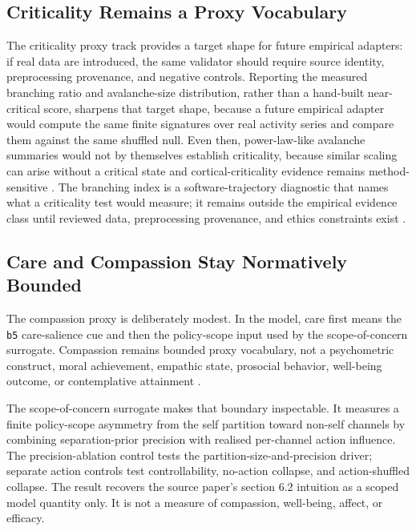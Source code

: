 \documentclass[
]{article}
\begin{document}
\subsection{Criticality Remains a Proxy
Vocabulary}\label{sec:discussion-criticality-proxy-boundary}

The criticality proxy track provides a target shape for future empirical
adapters: if real data are introduced, the same validator should require
source identity, preprocessing provenance, and negative controls.
Reporting the measured branching ratio and avalanche-size distribution,
rather than a hand-built near-critical score, sharpens that target
shape, because a future empirical adapter would compute the same finite
signatures over real activity series and compare them against the same
shuffled null. Even then, power-law-like avalanche summaries would not
by themselves establish criticality, because similar scaling can arise
without a critical state and cortical-criticality evidence remains
method-sensitive
\citep{touboul2017power_law_absence_criticality, destexhe2021criticality_evidence}.
The branching index is a software-trajectory diagnostic that names what
a criticality test would measure; it remains outside the empirical
evidence class until reviewed data, preprocessing provenance, and ethics
constraints exist \citep{wilting2019criticality}.

\subsection{Care and Compassion Stay Normatively
Bounded}\label{sec:discussion-compassion-boundary}

The compassion proxy is deliberately modest. In the model, care first
means the \texttt{b5} care-salience cue and then the policy-scope input
used by the scope-of-concern surrogate. Compassion remains bounded proxy
vocabulary, not a psychometric construct, moral achievement, empathic
state, prosocial behavior, well-being outcome, or contemplative
attainment
\citep{doctor2022care, strauss2016compassion_measurement, singer2014empathy_compassion}.

The scope-of-concern surrogate makes that boundary inspectable. It
measures a finite policy-scope asymmetry from the self partition toward
non-self channels by combining separation-prior precision with realised
per-channel action influence. The precision-ablation control tests the
partition-size-and-precision driver; separate action controls test
controllability, no-action collapse, and action-shuffled collapse. The
result recovers the source paper's section 6.2 intuition as a scoped
model quantity only. It is not a measure of compassion, well-being,
affect, or efficacy.
\end{document}
